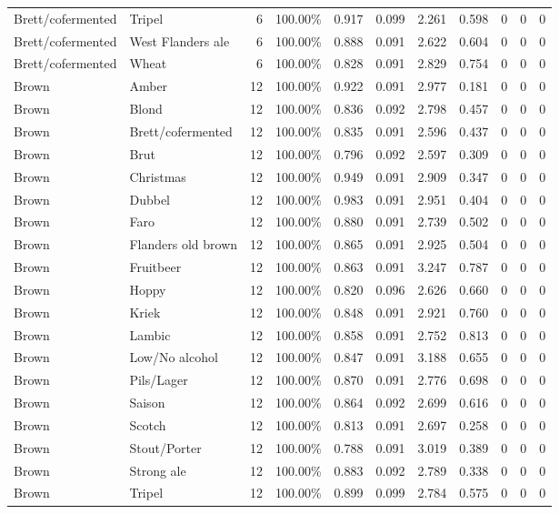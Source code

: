 {\begin{longtable}{llrrrrrrrrr}
Brett/cofermented & Tripel & 6 & 100.00\% & 0.917 & 0.099 & 2.261 & 0.598 & 0 & 0 & 0 \\
Brett/cofermented & West Flanders ale & 6 & 100.00\% & 0.888 & 0.091 & 2.622 & 0.604 & 0 & 0 & 0 \\
Brett/cofermented & Wheat & 6 & 100.00\% & 0.828 & 0.091 & 2.829 & 0.754 & 0 & 0 & 0 \\
Brown & Amber & 12 & 100.00\% & 0.922 & 0.091 & 2.977 & 0.181 & 0 & 0 & 0 \\
Brown & Blond & 12 & 100.00\% & 0.836 & 0.092 & 2.798 & 0.457 & 0 & 0 & 0 \\
Brown & Brett/cofermented & 12 & 100.00\% & 0.835 & 0.091 & 2.596 & 0.437 & 0 & 0 & 0 \\
Brown & Brut & 12 & 100.00\% & 0.796 & 0.092 & 2.597 & 0.309 & 0 & 0 & 0 \\
Brown & Christmas & 12 & 100.00\% & 0.949 & 0.091 & 2.909 & 0.347 & 0 & 0 & 0 \\
Brown & Dubbel & 12 & 100.00\% & 0.983 & 0.091 & 2.951 & 0.404 & 0 & 0 & 0 \\
Brown & Faro & 12 & 100.00\% & 0.880 & 0.091 & 2.739 & 0.502 & 0 & 0 & 0 \\
Brown & Flanders old brown & 12 & 100.00\% & 0.865 & 0.091 & 2.925 & 0.504 & 0 & 0 & 0 \\
Brown & Fruitbeer & 12 & 100.00\% & 0.863 & 0.091 & 3.247 & 0.787 & 0 & 0 & 0 \\
Brown & Hoppy & 12 & 100.00\% & 0.820 & 0.096 & 2.626 & 0.660 & 0 & 0 & 0 \\
Brown & Kriek & 12 & 100.00\% & 0.848 & 0.091 & 2.921 & 0.760 & 0 & 0 & 0 \\
Brown & Lambic & 12 & 100.00\% & 0.858 & 0.091 & 2.752 & 0.813 & 0 & 0 & 0 \\
Brown & Low/No alcohol & 12 & 100.00\% & 0.847 & 0.091 & 3.188 & 0.655 & 0 & 0 & 0 \\
Brown & Pils/Lager & 12 & 100.00\% & 0.870 & 0.091 & 2.776 & 0.698 & 0 & 0 & 0 \\
Brown & Saison & 12 & 100.00\% & 0.864 & 0.092 & 2.699 & 0.616 & 0 & 0 & 0 \\
Brown & Scotch & 12 & 100.00\% & 0.813 & 0.091 & 2.697 & 0.258 & 0 & 0 & 0 \\
Brown & Stout/Porter & 12 & 100.00\% & 0.788 & 0.091 & 3.019 & 0.389 & 0 & 0 & 0 \\
Brown & Strong ale & 12 & 100.00\% & 0.883 & 0.092 & 2.789 & 0.338 & 0 & 0 & 0 \\
Brown & Tripel & 12 & 100.00\% & 0.899 & 0.099 & 2.784 & 0.575 & 0 & 0 & 0 \\

\end{longtable}}
